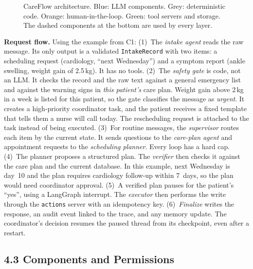 \documentclass[11pt,a4paper]{article}
\begin{document}
\begin{figure}[h]
\caption{CareFlow architecture. Blue: LLM components. Grey: deterministic code. Orange: human-in-the-loop. Green: tool servers and storage. The dashed components at the bottom are used by every layer.}
\label{fig:arch}
\end{figure}

\textbf{Request flow.} Using the example from C1:
(1)~The \emph{intake agent} reads the raw message. Its only output is a validated \texttt{IntakeRecord} with two items: a scheduling request (cardiology, ``next Wednesday'') and a symptom report (ankle swelling, weight gain of 2.5\,kg). It has no tools.
(2)~The \emph{safety gate} is code, not an LLM. It checks the record and the raw text against a general emergency list and against the warning signs in \emph{this patient's} care plan. Weight gain above 2\,kg in a week is listed for this patient, so the gate classifies the message as \emph{urgent}. It creates a high-priority coordinator task, and the patient receives a fixed template that tells them a nurse will call today. The rescheduling request is attached to the task instead of being executed.
(3)~For routine messages, the \emph{supervisor} routes each item by the current state. It sends questions to the \emph{care-plan agent} and appointment requests to the \emph{scheduling planner}. Every loop has a hard cap.
(4)~The planner proposes a structured plan. The \emph{verifier} then checks it against the care plan and the current database. In this example, next Wednesday is day~10 and the plan requires cardiology follow-up within 7~days, so the plan would need coordinator approval.
(5)~A verified plan pauses for the patient's ``yes'', using a LangGraph interrupt. The \emph{executor} then performs the write through the \texttt{actions} server with an idempotency key.
(6)~\emph{Finalize} writes the response, an audit event linked to the trace, and any memory update. The coordinator's decision resumes the paused thread from its checkpoint, even after a restart.

\subsection*{4.3 Components and Permissions}
\end{document}
